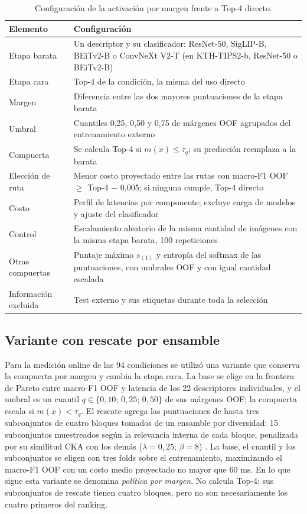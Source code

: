 \documentclass[a4paper,fleqn]{cas-sc}
\begin{document}
\begin{table}[pos=htbp]
\centering
\caption{Configuración de la activación por margen frente a Top-4 directo.}
\label{tab:config-margen}
\small
\begin{tabular}{lp{10.2cm}}
\toprule
Elemento & Configuración \\
\midrule
Etapa barata & Un descriptor y su clasificador: ResNet-50, SigLIP-B, BEiTv2-B o ConvNeXt V2-T (en KTH-TIPS2-b, ResNet-50 o BEiTv2-B) \\
Etapa cara & Top-4 de la condición, la misma del uso directo \\
Margen & Diferencia entre las dos mayores puntuaciones de la etapa barata \\
Umbral & Cuantiles 0,25, 0,50 y 0,75 de márgenes OOF agrupados del entrenamiento externo \\
Compuerta & Se calcula Top-4 si $m(x)\leq\tau_q$; su predicción reemplaza a la barata \\
Elección de ruta & Menor costo proyectado entre las rutas con macro-F1 OOF $\geq$ Top-4 $-$ 0,005; si ninguna cumple, Top-4 directo \\
Costo & Perfil de latencias por componente; excluye carga de modelos y ajuste del clasificador \\
Control & Escalamiento aleatorio de la misma cantidad de imágenes con la misma etapa barata, 100 repeticiones \\
Otras compuertas & Puntaje máximo $s_{(1)}$ y entropía del softmax de las puntuaciones, con umbrales OOF y con igual cantidad escalada \\
Información excluida & Test externo y sus etiquetas durante toda la selección \\
\bottomrule
\end{tabular}
\end{table}
\FloatBarrier

\subsection{Variante con rescate por ensamble}\label{sec:variante-panel}

Para la medición online de las 94 condiciones se utilizó una variante que conserva la compuerta por margen y cambia la etapa cara. La base se elige en la frontera de Pareto entre macro-F1 OOF y latencia de los 22 descriptores individuales, y el umbral es un cuantil $q\in\{0{,}10;\,0{,}25;\,0{,}50\}$ de sus márgenes OOF; la compuerta escala si $m(x)<\tau_q$. El rescate agrega las puntuaciones de hasta tres subconjuntos de cuatro bloques tomados de un ensamble por diversidad: 15 subconjuntos muestreados según la relevancia interna de cada bloque, penalizada por su similitud CKA con los demás ($\lambda=0{,}25$; $\beta=8$) \citep{kornblith2019similarity}. La base, el cuantil y los subconjuntos se eligen con tres folds sobre el entrenamiento, maximizando el macro-F1 OOF con un costo medio proyectado no mayor que 60 ms. En lo que sigue esta variante se denomina \emph{política por margen}. No calcula Top-4: sus subconjuntos de rescate tienen cuatro bloques, pero no son necesariamente los cuatro primeros del ranking.
\end{document}

